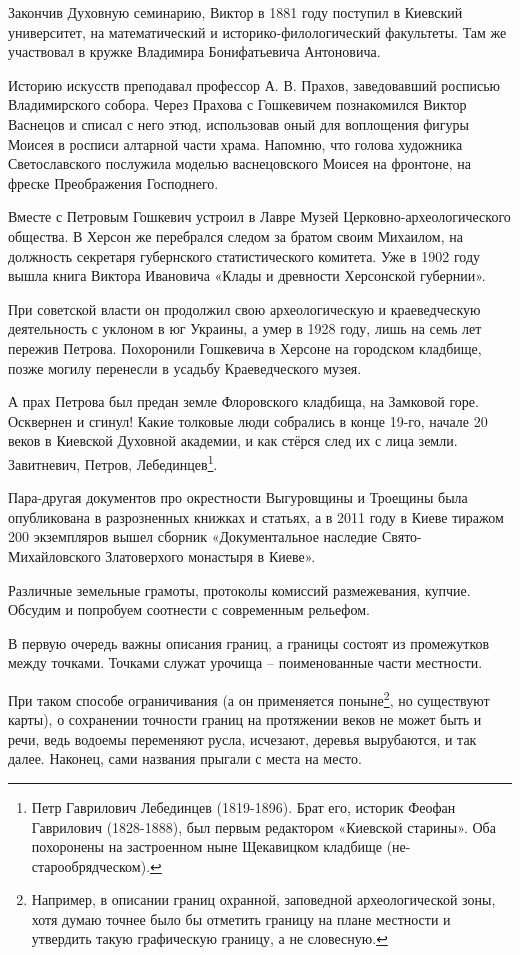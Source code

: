 Закончив Духовную семинарию, Виктор в 1881 году поступил в Киевский университет, на  математический и историко-филологический факультеты. Там же участвовал в кружке Владимира Бонифатьевича Антоновича.

Историю искусств преподавал профессор А. В. Прахов, заведовавший росписью Владимирского собора. Через Прахова с Гошкевичем познакомился Виктор Васнецов и списал с него этюд, использовав оный для воплощения фигуры Моисея в росписи алтарной части храма. Напомню, что голова художника Светославского послужила моделью васнецовского Моисея на фронтоне, на фреске Преображения Господнего.

Вместе с Петровым Гошкевич устроил в Лавре Музей Цер\-ковно-археологического общества. В Херсон же перебрался следом за братом своим Михаилом, на должность секретаря губернского статистического комитета. Уже в 1902 году вышла книга Виктора Ивановича «Клады и древности Херсонской губернии».

При советской власти он продолжил свою археологическую и краеведческую деятельность с уклоном в юг Украины, а умер в 1928 году, лишь на семь лет пережив Петрова. Похоронили Гошкевича в Херсоне на городском кладбище, позже могилу перенесли в усадьбу Краеведческого музея.

А прах Петрова был предан земле Флоровского кладбища, на Замковой горе. Осквернен и сгинул! Какие толковые люди собрались в конце 19-го, начале 20 веков в Киевской Духовной академии, и как стёрся след их с лица земли. Завитневич, Петров, Лебединцев\footnote{Петр Гаврилович Лебединцев (1819-1896). Брат его, историк Феофан Гаврилович (1828-1888), был первым редактором «Киевской старины». Оба похоронены на застроенном ныне Щекавицком кладбище (не-старообрядческом).}.

Пара-другая документов про окрестности Выгуровщины и Троещины была опубликована в разрозненных книжках и статьях, а в 2011 году в Киеве тиражом 200 экземпляров вышел сборник «Документальное наследие Свято-Михайловского Златоверхого монастыря в Киеве»\cite{mihdocs}.

Различные земельные грамоты, протоколы комиссий размежевания, купчие. Обсудим и попробуем соотнести с современным рельефом.

В первую очередь важны описания границ, а границы состоят из промежутков между точками. Точками служат урочища – поименованные части местности.

При таком способе ограничивания (а он применяется поныне\footnote{Например, в описании границ охранной, заповедной археологической зоны, хотя думаю точнее было бы отметить границу на плане местности и утвердить такую графическую границу, а не словесную.}, но существуют карты), о сохранении точности границ на протяжении веков не может быть и речи, ведь водоемы переменяют русла, исчезают, деревья вырубаются, и так далее. Наконец, сами названия прыгали с места на место. 

